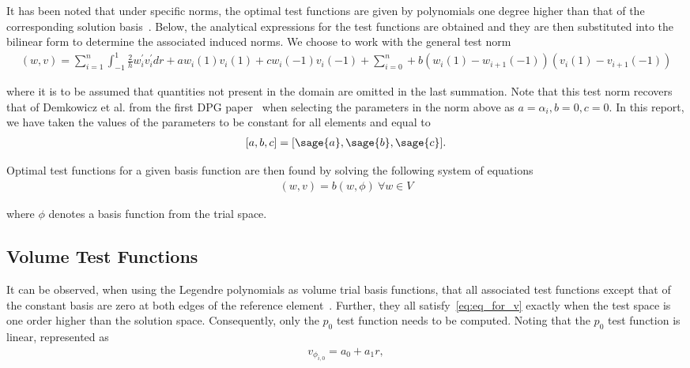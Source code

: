 \documentclass{article}
\numberwithin{equation}{section}
\newcommand{\makeblue}[1]{{\color{blue}#1}}
\begin{document}
It has been noted that under specific norms, the optimal test functions are given by polynomials one degree higher than
that of the corresponding solution basis~\cite[Section \makeblue{3C}]{Demkowicz2011}. Below, the analytical expressions
for the test functions are obtained and they are then substituted into the bilinear form to determine the associated
    induced norms. We choose to work with the general test norm
\begin{align}
(w,v) = \sum_{i=1}^{n}
\int_{-1}^{1} \frac{2}{h} w_i^{'}v_i^{'} dr
+ a w_i(1)v_i(1)
+ c w_{i}(-1)v_{i}(-1)
+ \sum_{i=0}^{n}
+ b(w_i(1)-w_{i+1}(-1))(v_i(1)-v_{i+1}(-1))
\end{align}

where it is to be assumed that quantities not present in the domain are omitted in the last summation. Note that this test
norm recovers that of Demkowicz et al. from the first DPG paper~\cite[Section \makeblue{2B}]{Demkowicz2011} when
selecting the parameters in the norm above as $a = \alpha_i, b = 0, c = 0$. In this report, we have taken the values of
the parameters to be constant for all elements and equal to
\begin{align} \label{eq:parameter_selection}
[a,b,c] = [\sage{a},\sage{b},\sage{c}].
\end{align}

Optimal test functions for a given basis function are then found by solving the following system of equations
\begin{align} \label{eq:eq_for_v}
(w,v) = b(w,\phi)\ \forall w \in V
\end{align}

where $\phi$ denotes a basis function from the trial space.

\subsection{Volume Test Functions}

It can be observed, when using the Legendre polynomials as volume trial basis functions, that all associated
test functions except that of the constant basis are zero at both edges of the reference element~\cite[Section
5.1]{BuiThanh2013}. Further, they all satisfy~\eqref{eq:eq_for_v} exactly when the test space is one order higher than
the solution space. Consequently, only the $p_0$ test function needs to be computed. Noting that the $p_0$ test function is
linear, represented as
\begin{align}
v_{{\phi}_{i,0}} = a_0 + a_1 r,
\end{align}
\end{document}
